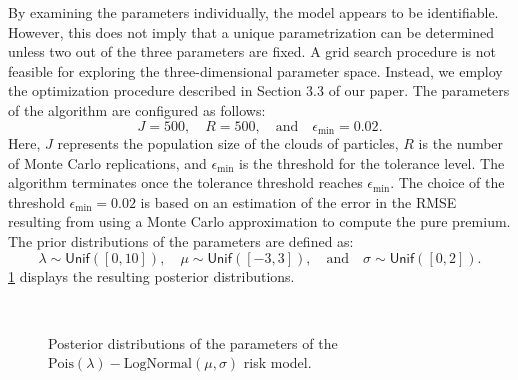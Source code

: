 \documentclass[10pt]{article}
\newcommand*{\UnifDist}{\mathsf{Unif}}
\begin{document}
By examining the parameters individually, the model appears to be identifiable. However, this does not imply that a unique parametrization can be determined unless two out of the three parameters are fixed. A grid search procedure is not feasible for exploring the three-dimensional parameter space. Instead, we employ the optimization procedure described in Section 3.3 of our paper. The parameters of the algorithm are configured as follows:  
$$
J = 500, \quad R = 500, \quad \text{and} \quad \epsilon_{\min} = 0.02.
$$
Here, $J$ represents the population size of the clouds of particles, $R$ is the number of Monte Carlo replications, and $\epsilon_{\min}$ is the threshold for the tolerance level. The algorithm terminates once the tolerance threshold reaches $\epsilon_{\min}$. The choice of the threshold $\epsilon_{\min} = 0.02$ is based on an estimation of the error in the RMSE resulting from using a Monte Carlo approximation to compute the pure premium. The prior distributions of the parameters are defined as:  
$$
\lambda \sim \UnifDist([0, 10]), \quad \mu \sim \UnifDist([-3, 3]), \quad \text{and} \quad \sigma \sim \UnifDist([0, 2]).
$$
\cref{fig:posterior_pure_premium} displays the resulting posterior distributions.

\begin{figure}[!ht]
  \begin{center}
    \\
    \caption{Posterior distributions of the parameters of the $\text{Pois}(\lambda)-\text{LogNormal}(\mu , \sigma)$ risk model.}
    \label{fig:posterior_pure_premium}
  \end{center}
\end{figure}
\end{document}

